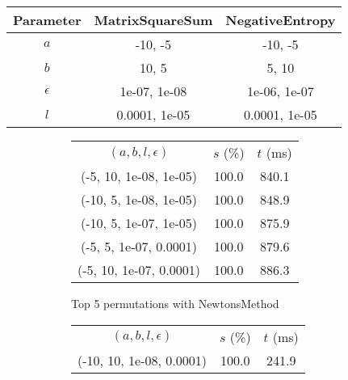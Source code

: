 \begin{center}
\label{tab:params_DichotomousSearch}
\begin{tabular}{|c|c|c|}
\hline
\rowcolor{gray!25}
Parameter & MatrixSquareSum & NegativeEntropy \\
\hline
$a$ & -10, -5 & -10, -5 \\
$b$ & 10, 5 & 5, 10 \\
$\epsilon$ & 1e-07, 1e-08 & 1e-06, 1e-07 \\
$l$ & 0.0001, 1e-05 & 0.0001, 1e-05 \\
\hline
\end{tabular}
\end{center}

\begin{figure}[H]
\label{fig:param_comp_MatrixSquareSum_DichotomousSearch}
\begin{subfigure}[ht]{.5\textwidth}
\begin{tabular}{|c|c|c|}
\hline
\rowcolor{gray!25}
\multicolumn{3}{|c|}{NewtonsMethod} \\
\hline
\rowcolor{gray!25}
$(a,b,l,\epsilon)$ & $s$ (\%) & $t$ (ms) \\
\hline
(-5, 10, 1e-08, 1e-05) & 100.0 & 840.1 \\
(-10, 5, 1e-08, 1e-05) & 100.0 & 848.9 \\
(-10, 5, 1e-07, 1e-05) & 100.0 & 875.9 \\
(-5, 5, 1e-07, 0.0001) & 100.0 & 879.6 \\
(-5, 10, 1e-07, 0.0001) & 100.0 & 886.3 \\
\hline
\end{tabular}
\caption{Top 5 permutations with NewtonsMethod}
\label{subfig:param_comp_MatrixSquareSum_NewtonsMethod_DichotomousSearch}
\end{subfigure}
\hfill
\begin{subfigure}[ht]{.5\textwidth}
\begin{tabular}{|c|c|c|}
\hline
\rowcolor{gray!25}
\multicolumn{3}{|c|}{GradientDescentMethod} \\
\hline
\rowcolor{gray!25}
$(a,b,l,\epsilon)$ & $s$ (\%) & $t$ (ms) \\
\hline
(-10, 10, 1e-08, 0.0001) & 100.0 & 241.9 \\

\end{tabular}
\end{subfigure}
\end{figure}

